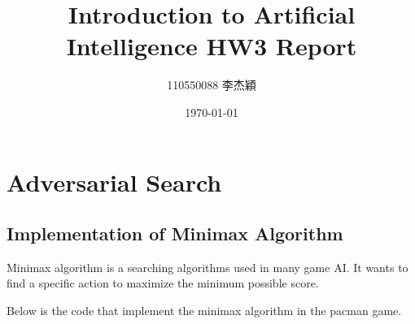 \documentclass{article}[12pt]
\title{Introduction to Artificial Intelligence HW3 Report}
\author{110550088 李杰穎}
\date{\today}
\begin{document}
\maketitle

\section{Adversarial Search}
\subsection{Implementation of Minimax Algorithm}

Minimax algorithm is a searching algorithms used in many game AI. 
It wants to find a specific action to maximize the minimum possible score.

Below is the code that implement the minimax algorithm in the pacman
game.
\end{document}
